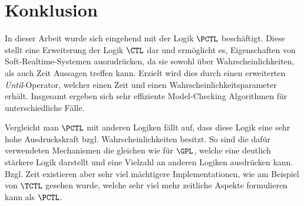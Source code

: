 \section{Konklusion}

In dieser Arbeit wurde sich eingehend mit der Logik $\PCTL$ beschäftigt.
Diese stellt eine Erweiterung der Logik $\CTL$ dar und ermöglicht es, Eigenschaften von Soft-Realtime-Systemen auszudrücken, da sie sowohl über Wahrscheinlichkeiten, als auch Zeit Aussagen treffen kann.
Erzielt wird dies durch einen erweiterten \textit{Until}-Operator, welcher einen Zeit und einen Wahrscheinlichkeitsparameter erhält.
Insgesamt ergeben sich sehr effiziente Model-Checking Algorithmen für unterschiedliche Fälle.

Vergleicht man $\PCTL$ mit anderen Logiken fällt auf, dass diese Logik eine sehr hohe Ausdruckskraft bzgl. Wahrscheinlichkeiten besitzt.
So sind die dafür verwendeten Mechanismen die gleichen wie für $\GPL$, welche eine deutlich stärkere Logik darstellt und eine Vielzahl an anderen Logiken ausdrücken kann.
Bzgl. Zeit existieren aber sehr viel mächtigere Implementationen, wie am Beispiel von $\TCTL$ gesehen wurde, welche sehr viel mehr zeitliche Aspekte formulieren kann als $\PCTL$.

